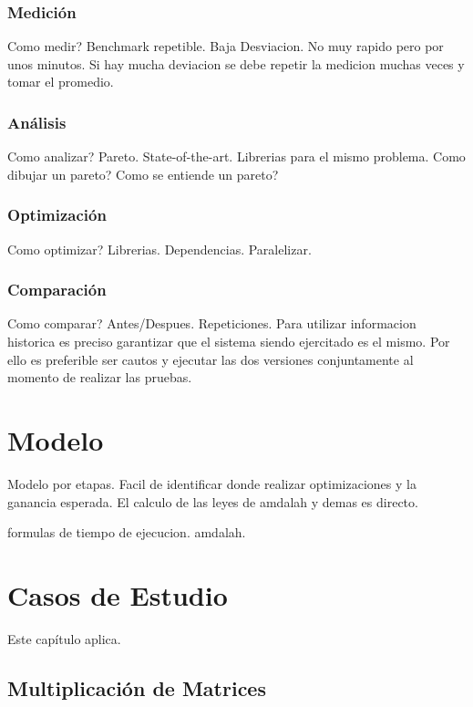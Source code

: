 \documentclass[a4paper]{report}
\begin{document}
\subsection{Medici\'on}

Como medir? Benchmark repetible. Baja Desviacion. No muy rapido pero por unos
minutos. Si hay mucha deviacion se debe repetir la medicion muchas veces y
tomar el promedio.

\subsection{An\'alisis}

Como analizar? Pareto. State-of-the-art. Librerias para el mismo problema.
Como dibujar un pareto? Como se entiende un pareto?

\subsection{Optimizaci\'on}

Como optimizar? Librerias. Dependencias. Paralelizar.

\subsection{Comparaci\'on}

Como comparar? Antes/Despues. Repeticiones. Para utilizar informacion
historica es preciso garantizar que el sistema siendo ejercitado es el mismo. Por ello es preferible ser cautos y ejecutar las dos versiones conjuntamente
al momento de realizar las pruebas.

\chapter{Modelo}

Modelo por etapas. Facil de identificar donde realizar optimizaciones y la
ganancia esperada. El calculo de las leyes de amdalah y demas es directo.

\bigskip

formulas de tiempo de ejecucion. amdalah.

\chapter{Casos de Estudio}

Este cap\'itulo aplica.

\section{Multiplicaci\'on de Matrices}
\end{document}
